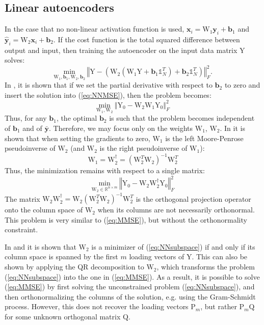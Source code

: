 \documentclass[journal]{IEEEtran}
\begin{document}
\subsection{Linear autoencoders}
In the case that no non-linear activation function is used, $\textbf{x}_i = \text{W}_1 \textbf{y}_i + \textbf{b}_1$ and $\hat{\textbf{y}}_i = \text{W}_2 \textbf{x}_i + \textbf{b}_2$. If the cost function is the total squared difference between output and input, then training the autoencoder on the input data matrix $\text{Y}$ solves:
\begin{equation}
\underset{\text{W}_1, \textbf{b}_1, \text{W}_2, \textbf{b}_2 }{\text{min}}{~
\left\Vert \text{Y} - \left(
\text{W}_2 \left(\text{W}_1 \text{Y} + \textbf{b}_1 \mathbb{1}_N^T \right) + \textbf{b}_2 \mathbb{1}_N^T
\right) \right\Vert_F^2 }.
\label{eq:NNMSE}
\end{equation}
In \cite{AutoencoderSVD}, it is shown that if we set the partial derivative with respect to $\textbf{b}_2$ to zero and insert the solution into (\ref{eq:NNMSE}), then the problem becomes:
\[
\underset{\text{W}_1, \text{W}_2 }{\text{min}}{~\left\Vert \text{Y}_0 - \text{W}_2 \text{W}_1 \text{Y}_0 \right\Vert_F^2}
\]
Thus, for any $\textbf{b}_1$, the optimal $\textbf{b}_2$ is such that the problem becomes independent of $\textbf{b}_1$ and of $\bar{\textbf{y}}$. Therefore, we may focus only on the weights $\text{W}_1$, $\text{W}_2$. In \cite{WithoutLocalMinima} it is shown that when setting the gradients to zero, $\text{W}_1$ is the left Moore-Penrose pseudoinverse of $\text{W}_2$ (and $\text{W}_2$ is the right pseudoinverse of $\text{W}_1$):
\[
\text{W}_1 = \text{W}_2^{\dagger} = \left( \text{W}_2^T \text{W}_2 \right)^{-1} \text{W}_2^T
\]
Thus, the minimization remains with respect to a single matrix:
\begin{equation}
\underset{\text{W}_2 \in \mathbb{R}^{n \times m}}{\text{min}}{~\left\Vert \text{Y}_0 - \text{W}_2 \text{W}_2^{\dagger} \text{Y}_0 \right\Vert_F^2}
\label{eq:NNsubspace}
\end{equation}
The matrix $\text{W}_2 \text{W}_2^{\dagger} = \text{W}_2 \left( \text{W}_2^T \text{W}_2 \right)^{-1} \text{W}_2^T$ is the orthogonal projection operator onto the column space of $\text{W}_2$ when its columns are not necessarily orthonormal. This problem is very similar to (\ref{eq:MMSE}), but without the orthonormality constraint.

In \cite{AutoencoderSVD} and \cite{WithoutLocalMinima} it is shown that $\text{W}_2$ is a minimizer of (\ref{eq:NNsubspace}) if and only if its column space is spanned by the first $m$ loading vectors of $\text{Y}$. This can also be shown by applying the QR decomposition to $\text{W}_2$, which transforms the problem (\ref{eq:NNsubspace}) into the one in (\ref{eq:MMSE}). As a result, it is possible to solve (\ref{eq:MMSE}) by first solving the unconstrained problem (\ref{eq:NNsubspace}), and then orthonormalizing the columns of the solution, e.g. using the Gram-Schmidt process. However, this does not recover the loading vectors $\text{P}_m$, but rather $\text{P}_m \text{Q}$ for some unknown orthogonal matrix $\text{Q}$.
\end{document}

